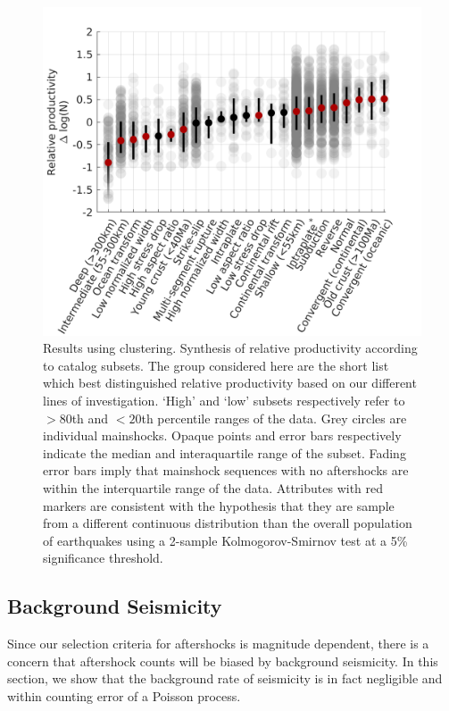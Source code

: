 \documentclass[draft]{agujournal}
\begin{document}
\begin{figure}[H]
    \centering

        \includegraphics[width=0.6\linewidth]{figures/cal_tech_z2008.png}
    
    \caption{Results using \citet{Zaliapin2008} clustering. Synthesis of relative productivity according to catalog subsets. The group considered here are the short list which best distinguished relative productivity based on our different lines of investigation. `High' and `low' subsets respectively refer to $>\!\!80$th and $<\!\!20$th percentile ranges of the data. Grey circles are individual mainshocks. Opaque points and error bars respectively indicate the median and interaquartile range of the subset. Fading error bars imply that mainshock sequences with no aftershocks are within the interquartile range of the data. Attributes with red markers are consistent with the hypothesis that they are sample from a different continuous distribution than the overall population of earthquakes using a 2-sample Kolmogorov-Smirnov test at a 5\% significance threshold.}
        \label{fig:caltechzaliapin}
\end{figure}



\subsection{Background Seismicity}\label{sec:background}

Since our selection criteria for aftershocks is magnitude dependent, there is a concern that aftershock counts will be biased by background seismicity. In this section, we show that the background rate of seismicity is in fact negligible and within counting error of a Poisson process.
\end{document}
